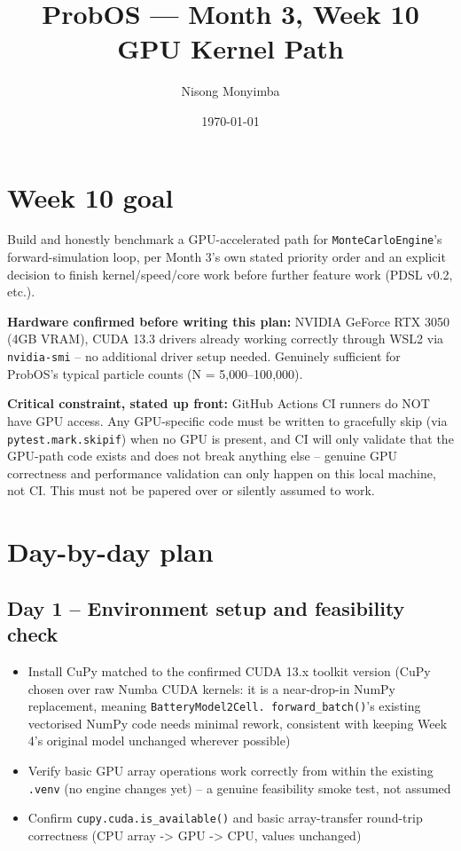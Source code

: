 \documentclass[11pt]{article}
\title{ProbOS --- Month 3, Week 10\\GPU Kernel Path}
\author{Nisong Monyimba}
\date{\today}
\begin{document}
\maketitle

\section*{Week 10 goal}
Build and honestly benchmark a GPU-accelerated path for
\texttt{MonteCarloEngine}'s forward-simulation loop, per Month 3's
own stated priority order and an explicit decision to finish
kernel/speed/core work before further feature work (PDSL v0.2, etc.).

\textbf{Hardware confirmed before writing this plan:} NVIDIA GeForce
RTX 3050 (4GB VRAM), CUDA 13.3 drivers already working correctly
through WSL2 via \texttt{nvidia-smi} -- no additional driver setup
needed. Genuinely sufficient for ProbOS's typical particle counts
(N = 5{,}000--100{,}000).

\textbf{Critical constraint, stated up front:} GitHub Actions CI
runners do NOT have GPU access. Any GPU-specific code must be written
to gracefully skip (via \texttt{pytest.mark.skipif}) when no GPU is
present, and CI will only validate that the GPU-path code exists and
does not break anything else -- genuine GPU correctness and
performance validation can only happen on this local machine, not CI.
This must not be papered over or silently assumed to work.

\section*{Day-by-day plan}

\subsection*{Day 1 -- Environment setup and feasibility check}
\begin{itemize}[leftmargin=*]
  \item Install CuPy matched to the confirmed CUDA 13.x toolkit
    version (CuPy chosen over raw Numba CUDA kernels: it is a
    near-drop-in NumPy replacement, meaning \texttt{BatteryModel2Cell.
    forward\_batch()}'s existing vectorised NumPy code needs minimal
    rework, consistent with keeping Week 4's original model
    unchanged wherever possible)
  \item Verify basic GPU array operations work correctly from within
    the existing \texttt{.venv} (no engine changes yet) -- a genuine
    feasibility smoke test, not assumed
  \item Confirm \texttt{cupy.cuda.is\_available()} and basic
    array-transfer round-trip correctness (CPU array -> GPU -> CPU,
    values unchanged)
\end{itemize}
\end{document}

